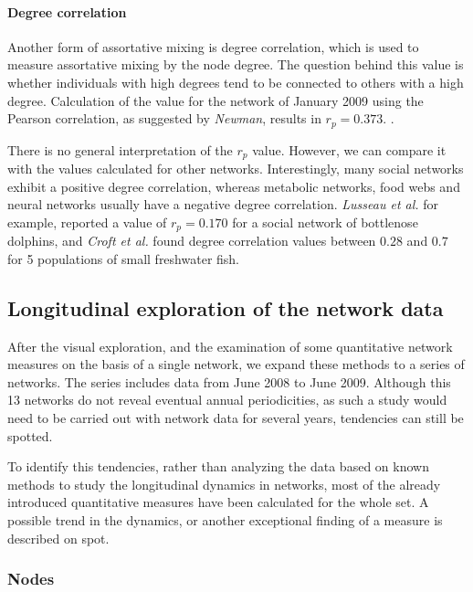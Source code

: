 \paragraph{Degree correlation}
\label{para:degree_corr}
 
Another form of assortative mixing is degree correlation, which is used to measure assortative mixing by the node degree. The question behind this value is whether individuals with high degrees tend to be connected to others with a high degree\citep{croft:07}. Calculation of the value for the network of January 2009 using the Pearson correlation, as suggested by \textit{Newman}\citep{newman:02}, results in $r_p = 0.373$. \citep{newman:03a}. 

There is no general interpretation of the $r_p$ value. However, we can compare it with the values calculated for other networks. Interestingly, many social networks exhibit a positive degree correlation, whereas metabolic networks, food webs and neural networks usually have a negative degree correlation\citep{newman:03a}. \textit{Lusseau et al.}\citep{lusseau:06} for example, reported a value of $r_p = 0.170$ for a social network of bottlenose dolphins, and \textit{Croft et al.}\citep{croft:05} found degree correlation values between $0.28$ and $0.7$ for 5 populations of small freshwater fish.   
 
\subsection{Longitudinal exploration of the network data}
\label{subsec:longitudinal}

After the visual exploration, and the examination of some quantitative network measures on the basis of a single network, we expand these methods to a series of networks. The series includes data from June 2008 to June 2009. Although this 13 networks do not reveal eventual annual periodicities, as such a study would need to be carried out with network data for several years, tendencies can still be spotted.
 
To identify this tendencies, rather than analyzing the data based on known methods to study the longitudinal dynamics in networks\citep{snijders:05}, most of the already introduced quantitative measures have been calculated for the whole set. A possible trend in the dynamics, or another exceptional finding of a measure is described on spot.

\subsubsection{Nodes}

